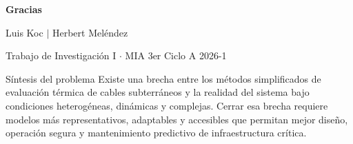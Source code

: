 \documentclass[aspectratio=169]{beamer}
\begin{document}
\begin{frame}
\centering
{\Large \textbf{Gracias}}

\vspace{1.0em}
\large Luis Koc \quad $|$ \quad Herbert Meléndez

\vspace{0.5em}
\normalsize Trabajo de Investigación I $\cdot$ MIA 3er Ciclo A 2026-1

\vspace{0.8em}
\begin{block}{\centering Síntesis del problema}
\centering\small
Existe una brecha entre los métodos simplificados de evaluación térmica de
cables subterráneos y la realidad del sistema bajo condiciones heterogéneas,
dinámicas y complejas. Cerrar esa brecha requiere modelos más representativos,
adaptables y accesibles que permitan mejor diseño, operación segura y
mantenimiento predictivo de infraestructura crítica.
\end{block}
\end{frame}
\end{document}
